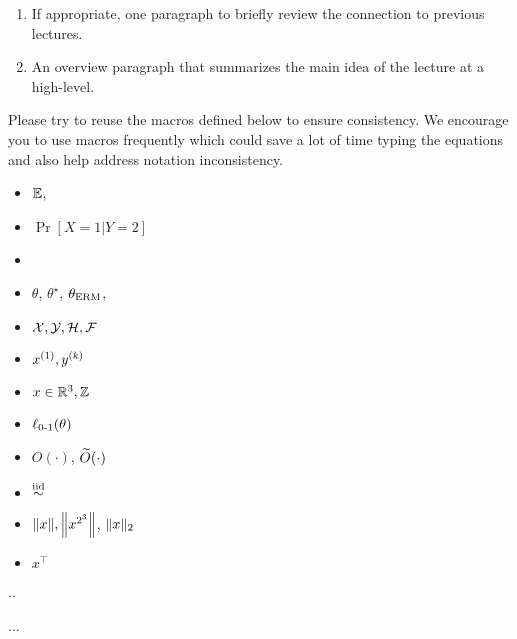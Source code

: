 
\setcounter{section}{0}



\begin{enumerate}
	\item If appropriate, one paragraph to briefly review the connection to previous lectures.
	\item An overview paragraph that summarizes the main idea of the lecture at a high-level. 
\end{enumerate}  
Please try to reuse the macros defined below to ensure consistency. {\color{blue}We encourage you to use macros frequently which could save a lot of time typing the equations and also help address notation inconsistency. }
\begin{itemize}
	\item $\Exp$, 
	\item $\Pr[X=1\vert Y=2]$
	\item 
	\item 
	$\theta$, $\theta^\star$, $\thetaerm$, 
	\item 
	$\cX,\cY, \cH, \cF$
	\item $x\sp{1}, y\sp{k}$
	\item 
	$x\in \R^3, \bbZ$
	\item $\err(\theta)$
	\item $O(\cdot)$, $\tilO(\cdot)$
	\item $\iid$
	\item $\norm{x}, \Norm{x^{2^3}}$, $\norm{x}_{2}$
	\item $x^\top$ 
\end{itemize}
\begin{theorem}
	..
\end{theorem}
\begin{lemma}
	...
\end{lemma}


	
\lipsum
